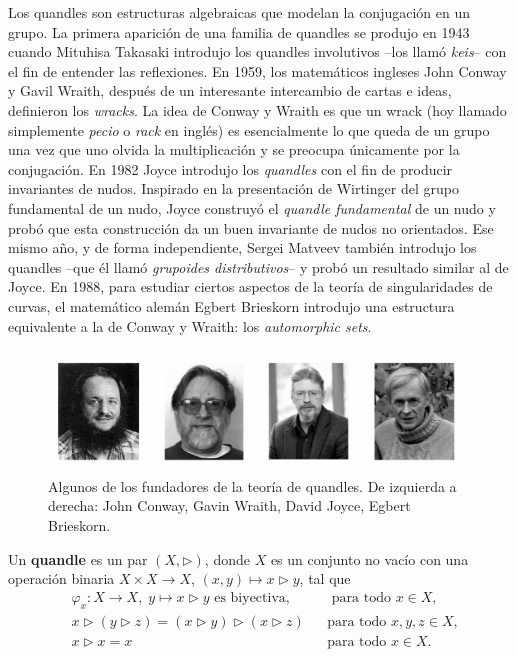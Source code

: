 \documentclass[graybox]{svmult}
\begin{document}
Los quandles son estructuras algebraicas que modelan la conjugación en un
grupo. La primera aparición de una familia de quandles se produjo en 1943
cuando Mituhisa Takasaki introdujo los quandles involutivos --los llamó
\emph{keis}-- con el fin de entender las reflexiones. En 1959, los matemáticos
ingleses John Conway y Gavil Wraith, después de un interesante intercambio
de cartas e ideas, definieron los \emph{wracks}. La idea de Conway y Wraith
es que un wrack (hoy llamado simplemente \emph{pecio} o \emph{rack} en
inglés) es esencialmente lo que queda de un grupo una vez que uno olvida la
multiplicación y se preocupa únicamente por la conjugación.  En 1982 Joyce
introdujo los \emph{quandles} con el fin de producir invariantes de nudos.
Inspirado en la presentación de Wirtinger del grupo fundamental de un nudo,
Joyce construyó el \emph{quandle fundamental} de un nudo y probó que esta
construcción da un buen invariante de nudos no orientados.  Ese mismo año,
y de forma independiente, Sergei Matveev también introdujo los quandles
--que él llamó \emph{grupoides distributivos}-- y probó un resultado similar
al de Joyce.  En 1988, para estudiar ciertos aspectos de la teoría de
singularidades de curvas, el matemático alemán Egbert Brieskorn introdujo
una estructura equivalente a la de Conway y Wraith: los \emph{automorphic
sets}. 
    \begin{figure}[h]
		\centering
        \includegraphics[scale=0.4]{images/cwjb}
        \caption{Algunos de los fundadores de la teoría de quandles. De
        izquierda a derecha: John Conway, Gavin Wraith, David Joyce, Egbert Brieskorn.}
    \end{figure}

	\begin{definition}
		\label{block:quandle}
		Un \textbf{quandle} es un par $(X,\triangleright)$, donde $X$ es un
		conjunto no vacío con una operación binaria $X\times X\to X$,
		$(x,y)\mapsto x\triangleright y$, tal que
		\begin{align}
			& \varphi_x\colon X\to X,\;y\mapsto x\triangleright y\text{ es biyectiva},&&\text{ para todo $x\in X$},\\
			& x\triangleright (y\triangleright z)=(x\triangleright y)\triangleright (x\triangleright z) && \text{para todo $x,y,z\in X$},\\
			& x\triangleright x=x && \text{para todo $x\in X$}.
		\end{align}
	\end{definition}
\end{document}
